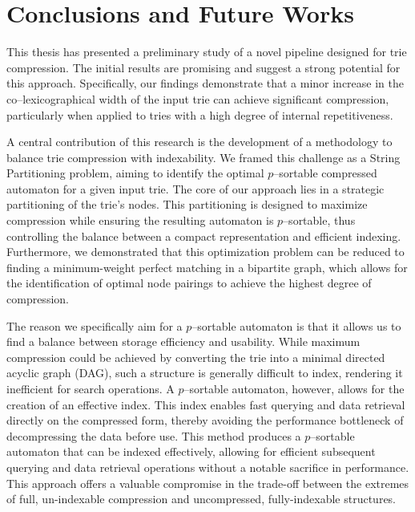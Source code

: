 \chapter{Conclusions and Future Works} \label{chp:conclusions}
This thesis has presented a preliminary study of a novel pipeline designed for trie compression. The initial results are promising and suggest a strong potential for this approach. Specifically, our findings demonstrate that a minor increase in the co--lexicographical width of the input trie can achieve significant compression, particularly when applied to tries with a high degree of internal repetitiveness.

A central contribution of this research is the development of a methodology to balance trie compression with indexability. We framed this challenge as a String Partitioning problem, aiming to identify the optimal $p$--sortable compressed automaton for a given input trie. The core of our approach lies in a strategic partitioning of the trie's nodes. This partitioning is designed to maximize compression while ensuring the resulting automaton is $p$--sortable, thus controlling the balance between a compact representation and efficient indexing. Furthermore, we demonstrated that this optimization problem can be reduced to finding a minimum-weight perfect matching in a bipartite graph, which allows for the identification of optimal node pairings to achieve the highest degree of compression.

The reason we specifically aim for a $p$--sortable automaton is that it allows us to find a balance between storage efficiency and usability. While maximum compression could be achieved by converting the trie into a minimal directed acyclic graph (DAG), such a structure is generally difficult to index, rendering it inefficient for search operations. A $p$--sortable automaton, however, allows for the creation of an effective index. This index enables fast querying and data retrieval directly on the compressed form, thereby avoiding the performance bottleneck of decompressing the data before use. This method produces a $p$--sortable automaton that can be indexed effectively, allowing for efficient subsequent querying and data retrieval operations without a notable sacrifice in performance. This approach offers a valuable compromise in the trade-off between the extremes of full, un-indexable compression and uncompressed, fully-indexable structures.

